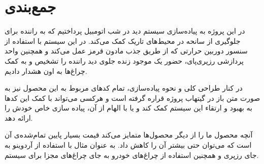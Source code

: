 \chapter{جمع‌بندی}
در این پروژه به پیاده‌سازی سیستم دید در شب اتومبیل پرداختیم که به راننده برای جلوگیری از سانحه در محیط‌های تاریک کمک می‌کند. در این سیستم با استفاده از سنسور دوربین حرارتی که از طریق جذب مادون قرمز عمل می‌کند و همچنین واحد پردازشی رزپری‌پای، حضور یک موجود زنده جلوی دید راننده را تشخیص و به کمک چرا‌غ‌ها به اون هشدار دادیم. 

در کنار طراحی کلی و نحوه پیاده‌سازی، تمام کد‌های مربوط به این محصول نیز به صورت متن باز در گیتهاب پروژه قراره گرفته است و هرکسی می‌تواند با کمک این کدها به بهبود و ارتقاء این سیستم کمک کند و یا با الهام از آن، پیاده سازی خاص خودش را ارائه دهد. 

آنچه محصول ما را از دیگر محصول‌ها متمایز می‌کند قیمت بسیار پایین تمام‌شده‌ی ‌آن است که می‌توان حتی بیشتر آن را کاهش داد. به عنوان مثال با استفاده از آردوینو به جای رزپری و همچنین استفاده از چراغ‌های خودرو به جای چراغ‌های مجزا برای سیستم.